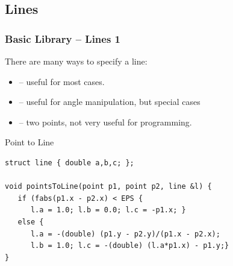 \documentclass{beamer}
\begin{document}
\subsection{Lines}

\begin{frame}[fragile]
  \frametitle{Basic Library -- Lines 1}

  {\small
  There are many ways to specify a line:

  \begin{itemize}
  \item {} -- useful for most cases.
  \item {} -- useful for angle manipulation, but special cases
  \item {} -- two points, not very useful for programming.
  \end{itemize}

  \begin{exampleblock}{Point to Line}
\begin{verbatim}
struct line { double a,b,c; };

void pointsToLine(point p1, point p2, line &l) {
   if (fabs(p1.x - p2.x) < EPS {
      l.a = 1.0; l.b = 0.0; l.c = -p1.x; }
   else {
      l.a = -(double) (p1.y - p2.y)/(p1.x - p2.x);
      l.b = 1.0; l.c = -(double) (l.a*p1.x) - p1.y;}
}
\end{verbatim}
  \end{exampleblock}
  }
\end{frame}
\end{document}
